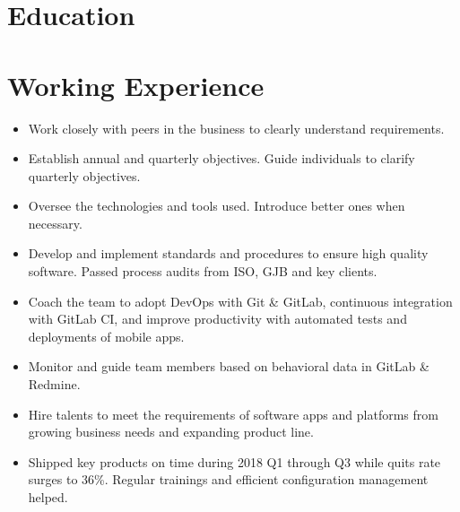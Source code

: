 \documentclass[11pt,a4paper]{moderncv/moderncv}
\begin{document}
\maketitle



\section{Education}

\section{Working Experience}

{
\begin{itemize}
	\item Work closely with peers in the business to clearly understand requirements.
	\item Establish annual and quarterly objectives. Guide individuals to clarify quarterly objectives.
	\item Oversee the technologies and tools used. Introduce better ones when necessary.
	\item Develop and implement standards and procedures to ensure high quality software. Passed process audits from ISO, GJB and key clients.
	\item Coach the team to adopt DevOps with Git \& GitLab, continuous integration with GitLab CI, and improve productivity with automated tests and deployments of mobile apps.
	\item Monitor and guide team members based on behavioral data in GitLab \& Redmine.
	\item Hire talents to meet the requirements of software apps and platforms from growing business needs and expanding product line.
	\item Shipped key products on time during 2018 Q1 through Q3 while quits rate surges to 36\%. Regular trainings and efficient configuration management helped.
\end{itemize}
}
\end{document}

